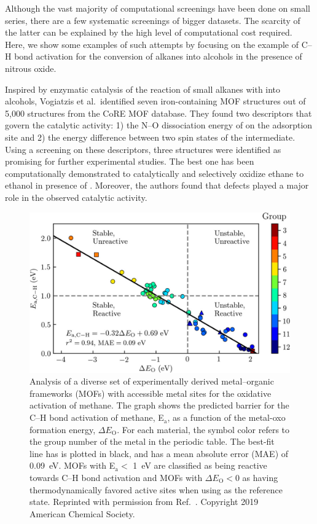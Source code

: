 \documentclass[main.tex]{subfiles}
\begin{document}
Although the vast majority of computational screenings have been done on small series, there are a few systematic screenings of bigger datasets. The scarcity of the latter can be explained by the high level of computational cost required. Here, we show some examples of such attempts by focusing on the example of C--H bond activation for the conversion of alkanes into alcohols in the presence of nitrous oxide.

Inspired by enzymatic catalysis of the reaction of small alkanes with  into alcohols, Vogiatzis et al.\ identified  seven iron-containing MOF structures out of 5,000 structures from the CoRE MOF database.\cite{Vogiatzis_2016} They found two descriptors that govern the catalytic activity: 1) the N--O dissociation energy of  on the adsorption site and 2) the energy difference between two spin states of the intermediate.
Using a screening on these descriptors, three structures were identified as promising for further experimental studies. The best one has been computationally demonstrated to catalytically and selectively oxidize ethane to ethanol in presence of . Moreover, the authors found that defects played a major role in the observed catalytic activity.

\begin{figure}[ht]
\centering
  \includegraphics[width=0.8\linewidth]{figures/1-screening/Rosen_2019.jpeg}
  \caption{Analysis of a diverse set of experimentally derived metal--organic frameworks (MOFs) with accessible metal sites for the oxidative activation of methane. The graph shows the predicted barrier for the C--H bond activation of methane, E$_\text{a}$, as a function of the metal-oxo formation energy, $\Delta E_\text{O}$. For each material, the symbol color refers to the group number of the metal in the periodic table. The best-fit line has is plotted in black, and has a mean absolute error (MAE) of \SI{0.09}{\eV}. MOFs with E$_\text{a}<$ \SI{1}{\eV} are classified as being reactive towards C--H bond activation and MOFs with $\Delta E_\text{O}<0$ as having thermodynamically favored active sites when using  as the reference state. Reprinted with permission from Ref.~. Copyright 2019 American Chemical Society.}
  \label{fgr:Rosen_2019}
\end{figure}
\end{document}
